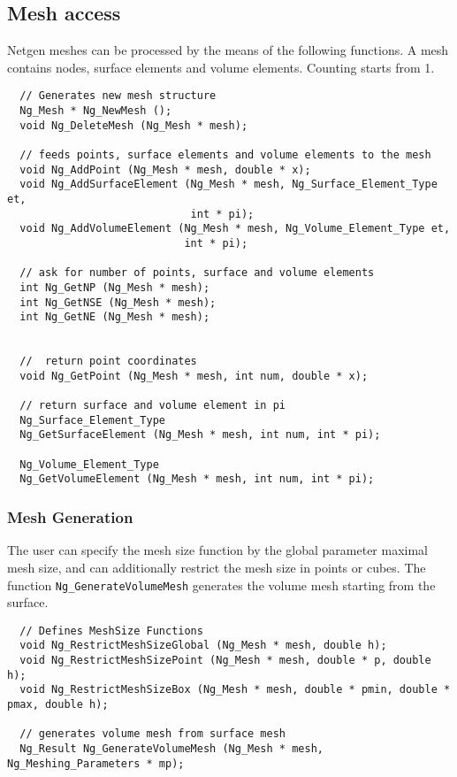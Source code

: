 \documentclass[12pt]{book}
\begin{document}
\subsection{Mesh access}
Netgen meshes can be processed by the means of the following functions.
A mesh contains nodes, surface elements and volume elements. Counting
starts from 1.

\begin{verbatim}
  // Generates new mesh structure
  Ng_Mesh * Ng_NewMesh ();
  void Ng_DeleteMesh (Ng_Mesh * mesh);
  
  // feeds points, surface elements and volume elements to the mesh
  void Ng_AddPoint (Ng_Mesh * mesh, double * x);
  void Ng_AddSurfaceElement (Ng_Mesh * mesh, Ng_Surface_Element_Type et,
                             int * pi);
  void Ng_AddVolumeElement (Ng_Mesh * mesh, Ng_Volume_Element_Type et,
                            int * pi);
  
  // ask for number of points, surface and volume elements
  int Ng_GetNP (Ng_Mesh * mesh);
  int Ng_GetNSE (Ng_Mesh * mesh);
  int Ng_GetNE (Ng_Mesh * mesh);

  
  //  return point coordinates
  void Ng_GetPoint (Ng_Mesh * mesh, int num, double * x);

  // return surface and volume element in pi
  Ng_Surface_Element_Type 
  Ng_GetSurfaceElement (Ng_Mesh * mesh, int num, int * pi);

  Ng_Volume_Element_Type
  Ng_GetVolumeElement (Ng_Mesh * mesh, int num, int * pi);
\end{verbatim}


\subsubsection{Mesh Generation}
The user can specify the mesh size function by the global parameter
maximal mesh size, and can additionally restrict the mesh size in
points or cubes. The function {\tt Ng\_GenerateVolumeMesh} generates
the volume mesh starting from the surface.

\begin{verbatim}
  // Defines MeshSize Functions
  void Ng_RestrictMeshSizeGlobal (Ng_Mesh * mesh, double h);
  void Ng_RestrictMeshSizePoint (Ng_Mesh * mesh, double * p, double h);
  void Ng_RestrictMeshSizeBox (Ng_Mesh * mesh, double * pmin, double * pmax, double h);
  
  // generates volume mesh from surface mesh
  Ng_Result Ng_GenerateVolumeMesh (Ng_Mesh * mesh, Ng_Meshing_Parameters * mp);
\end{verbatim}
\end{document}

